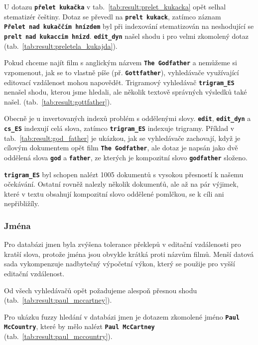 \documentclass[11pt,letterpaper,oneside,openright]{book}
\newcommand{\bftt}[1]{\texttt{\textbf{#1}}}
\begin{document}
U dotazu \bftt{přelet~kukačka} v tab.~\ref{tab:result:prelet_kukacka} opět
selhal stematizér češtiny. Dotaz se převedl na \bftt{prelt~kukack}, zatímco
záznam \bftt{Přelet~nad~kukaččím~hnízdem} byl při indexování stematizován na
neshodující se \bftt{prelt~nad~kukaccim~hnizd}. \bftt{edit\_dyn} našel shodu i
pro velmi zkomolený dotaz (tab.~\ref{tab:result:preletela_kukajda}).

\mbox{}\mbox{}

Pokud chceme najít film s anglickým názvem \bftt{The Godfather} a nemůžeme si
vzpomenout, jak se to vlastně píše (př. \bftt{Gottfather}), vyhledávače
využívající editovací vzdálenost mohou napovědět. Trigramový vyhledávač
\bftt{trigram\_ES} nenašel shodu, kterou jsme hledali, ale několik textově
správných výsledků také našel.  (tab.~\ref{tab:result:gottfather}).

\mbox{}\mbox{}

Obecně je u invertovaných indexů problém s oddělenými slovy. \bftt{edit},
\bftt{edit\_dyn} a \bftt{cs\_ES} indexují celá slova, zatímco
\bftt{trigram\_ES} indexuje trigramy. Příklad v
tab.~\ref{tab:result:god_father} je ukázkou, jak se vyhledávače zachovají, když
je cílovým dokumentem opět film \bftt{The Godfather}, ale dotaz je napsán jako
dvě oddělená slova \bftt{god} a \bftt{father}, ze kterých je kompozitní slovo
\bftt{godfather} složeno.

\bftt{trigram\_ES} byl schopen nalézt 1005 dokumentů s vysokou přesností k
našemu očekávání. Ostatní rovněž nalezly několik dokumenťů, ale až na pár
výjimek, které v textu obsahují kompozitní slovo oddělené pomlčkou, se k cíli
ani nepřibližíly.

\subsubsection{Jména}
Pro databázi jmen byla zvýšena tolerance překlepů v editační vzdálenosti pro
kratší slova, protože jména jsou obvykle krátká proti názvům filmů. Menší
datová sada vykompenzuje nadbytečný výpočetní výkon, který se použije pro vyšší
editační vzdálenost.

\mbox{}\mbox{}

Od všech vyhledávačů opět požadujeme alespoň přesnou shodu
(tab.~\ref{tab:result:paul_mccartney}).

\mbox{}\mbox{}

Pro ukázku fuzzy hledání v databázi jmen je dotazem zkomolené jméno
\bftt{Paul McCountry}, které by mělo nalézt \bftt{Paul McCartney}
(tab.~\ref{tab:result:paul_mccountry}).
\end{document}
